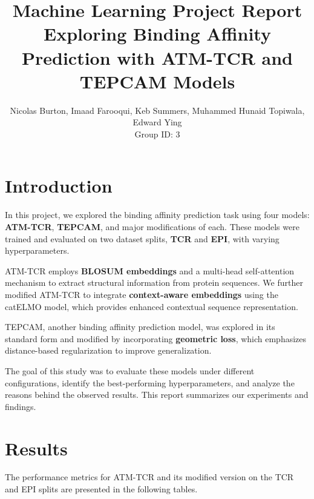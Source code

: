 \documentclass[11pt,a4paper]{article}
\title{
    Machine Learning Project Report \\ 
    \large Exploring Binding Affinity Prediction with ATM-TCR and TEPCAM Models
}
\author{
    Nicolas Burton, Imaad Farooqui, Keb Summers, Muhammed Hunaid Topiwala, Edward Ying \\ 
    Group ID: 3
}
\date{}
\begin{document}
\maketitle

\section{Introduction}
In this project, we explored the binding affinity prediction task using four models: \textbf{ATM-TCR}, \textbf{TEPCAM}, and major modifications of each. These models were trained and evaluated on two dataset splits, \textbf{TCR} and \textbf{EPI}, with varying hyperparameters.

\bigskip

ATM-TCR employs \textbf{BLOSUM embeddings} and a multi-head self-attention mechanism to extract structural information from protein sequences. We further modified ATM-TCR to integrate \textbf{context-aware embeddings} using the catELMO model, which provides enhanced contextual sequence representation.

\bigskip

TEPCAM, another binding affinity prediction model, was explored in its standard form and modified by incorporating \textbf{geometric loss}, which emphasizes distance-based regularization to improve generalization.

\bigskip

The goal of this study was to evaluate these models under different configurations, identify the best-performing hyperparameters, and analyze the reasons behind the observed results. This report summarizes our experiments and findings.


\section{Results}
The performance metrics for ATM-TCR and its modified version on the TCR and EPI splits are presented in the following tables.
\end{document}

